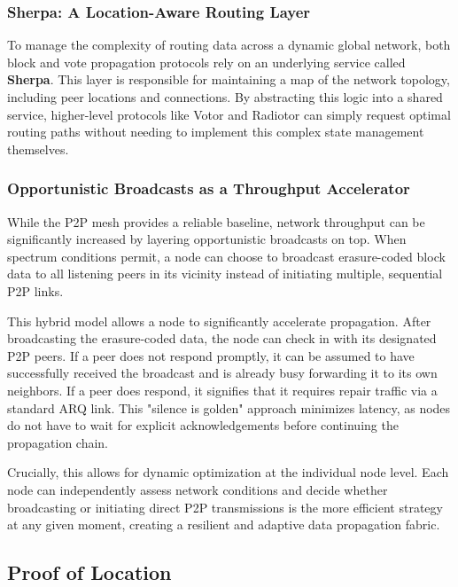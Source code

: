 \documentclass{article}
\begin{document}
\subsubsection{Sherpa: A Location-Aware Routing Layer}

To manage the complexity of routing data across a dynamic global network, both block and vote propagation protocols rely on an underlying service called \textbf{Sherpa}. This layer is responsible for maintaining a map of the network topology, including peer locations and connections. By abstracting this logic into a shared service, higher-level protocols like Votor and Radiotor can simply request optimal routing paths without needing to implement this complex state management themselves.

\subsubsection{Opportunistic Broadcasts as a Throughput Accelerator}
\label{sec:opportunistic_broadcasts}

While the P2P mesh provides a reliable baseline, network throughput can be significantly increased by layering opportunistic broadcasts on top. When spectrum conditions permit, a node can choose to broadcast erasure-coded block data to all listening peers in its vicinity instead of initiating multiple, sequential P2P links.

This hybrid model allows a node to significantly accelerate propagation. After broadcasting the erasure-coded data, the node can check in with its designated P2P peers. If a peer does not respond promptly, it can be assumed to have successfully received the broadcast and is already busy forwarding it to its own neighbors. If a peer does respond, it signifies that it requires repair traffic via a standard ARQ link. This "silence is golden" approach minimizes latency, as nodes do not have to wait for explicit acknowledgements before continuing the propagation chain.

Crucially, this allows for dynamic optimization at the individual node level. Each node can independently assess network conditions and decide whether broadcasting or initiating direct P2P transmissions is the more efficient strategy at any given moment, creating a resilient and adaptive data propagation fabric.

\subsection{Proof of Location}
\label{sec:proof_of_location}
\end{document}
